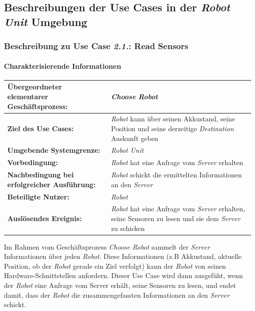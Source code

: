 				\pagebreak
		\subsection{Beschreibungen der Use Cases in der \emph{Robot Unit} Umgebung}
			\subsubsection{Beschreibung zu Use Case \emph{2.1.}: Read Sensors}
				
				\paragraph*{Charakterisierende Informationen}
				
				\begin{table}[H]
					\centering
					\begin{tabularx}{\textwidth}{|p{5cm}|X|}
						\hline
						\textbf{Übergeordneter elementarer Geschäftsprozess:} & \emph{Choose Robot} \\ \hline
						\textbf{Ziel des Use Cases:} & \emph{Robot} kann über seinen Akkustand, seine Position und seine derzeitige \emph{Destination} Auskunft geben\\ \hline
						\textbf{Umgebende Systemgrenze:} & \emph{Robot Unit} \\ \hline
						\textbf{Vorbedingung:} & \emph{Robot} hat eine Anfrage vom \emph{Server} erhalten \\ \hline
						\textbf{Nachbedingung bei erfolgreicher Ausführung:} & \emph{Robot} schickt die ermittelten Informationen an den \emph{Server} \\ \hline
						\textbf{Beteiligte Nutzer:} & \emph{Robot} \\ \hline
						\textbf{Auslösendes Ereignis:} & \emph{Robot} hat eine Anfrage vom \emph{Server} erhalten, seine Sensoren zu lesen und sie dem \emph{Server} zu schicken \\
						\hline
					\end{tabularx}
				\end{table}
				
				Im Rahmen vom Geschäftsprozess \emph{Choose Robot} sammelt der \emph{Server}
				Informationen über jeden \emph{Robot}. Diese Informationen (z.B
				Akkustand, aktuelle Position, ob der \emph{Robot} gerade ein Ziel verfolgt)
				kann der \emph{Robot} von seinen Hardware-Schnittstellen anfordern. Dieser
				Use Case wird dann ausgefüht, wenn der \emph{Robot} eine Anfrage vom
				Server erhält, seine Sensoren zu lesen, und endet damit, dass der \emph{Robot}
				die zusammengefassten Informationen an den \emph{Server} schickt.
				
